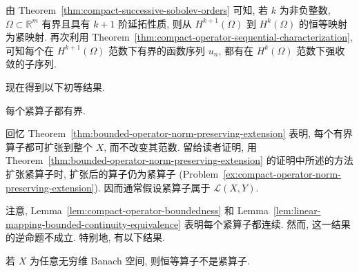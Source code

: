 \begin{Example}
\label{ex:successive-sobolev-orders-compact-operator}
由 Theorem~\ref{thm:compact-successive-sobolev-orders} 可知, 若 $k$ 为非负整数, $\Omega\subset\mathbb{R}^m$ 有界且具有 $k+1$ 阶延拓性质, 则从 $H^{k+1}(\Omega)$ 到 $H^k(\Omega)$ 的恒等映射为紧映射. 再次利用 Theorem~\ref{thm:compact-operator-sequential-characterization}, 可知每个在 $H^{k+1}(\Omega)$ 范数下有界的函数序列 $u_n$, 都有在 $H^k(\Omega)$ 范数下强收敛的子序列.
\end{Example}

现在得到以下初等结果.

\begin{Lemma}
\label{lem:compact-operator-boundedness}
每个紧算子都有界.
\end{Lemma}

\begingroup
{}
\renewcommand{\endProof}{\par\nobreak\hfill$\blacksquare$\par\vspace{0.1cm}}
\endgroup

回忆 Theorem~\ref{thm:bounded-operator-norm-preserving-extension} 表明, 每个有界算子都可扩张到整个 $X$, 而不改变其范数. 留给读者证明, 用 Theorem~\ref{thm:bounded-operator-norm-preserving-extension} 的证明中所述的方法扩张紧算子时, 扩张后的算子仍为紧算子 (Problem~\ref{ex:compact-operator-norm-preserving-extension}). 因而通常假设紧算子属于 $\mathcal{L}(X,Y)$.

注意, Lemma~\ref{lem:compact-operator-boundedness} 和 Lemma~\ref{lem:linear-mapping-bounded-continuity-equivalence} 表明每个紧算子都连续. 然而, 这一结果的逆命题不成立. 特别地, 有以下结果.

\begin{Lemma}
\label{lem:infinite-dimensional-identity-noncompact}
若 $X$ 为任意无穷维 Banach 空间, 则恒等算子不是紧算子.
\end{Lemma}

\begingroup
{}
\renewcommand{\endProof}{\par\nobreak\hfill$\blacksquare$\par\vspace{0.1cm}}
\endgroup
